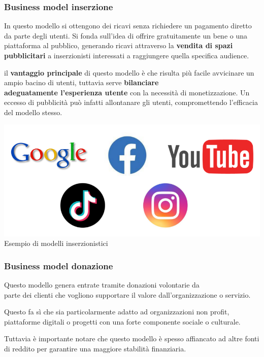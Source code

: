 \documentclass[14pt]{extarticle}
\begin{document}
\newpage
\subsubsection{Business model inserzione}

In questo modello si ottengono dei ricavi senza richiedere un pagamento diretto
da parte degli utenti. Si fonda sull'idea di offrire gratuitamente un bene o una
piattaforma al pubblico, generando ricavi attraverso la \textbf{vendita di spazi
pubblicitari} a inserzionisti interessati a raggiungere quella specifica
audience.

il \textbf{vantaggio principale} di questo modello è che risulta più facile
avvicinare un ampio bacino di utenti, tuttavia serve \textbf{bilanciare
\\adeguatamente l'esperienza utente} con la necessità di monetizzazione. Un
eccesso di pubblicità può infatti allontanare gli utenti, compromettendo
l'efficacia del modello stesso.

\begin{center}
    \includegraphics[scale=0.60]{images/inserzioni.png}
    Esempio di modelli inserzionistici
\end{center}

\subsubsection{Business model donazione}

Questo modello genera entrate tramite donazioni volontarie da \\parte dei
clienti che vogliono supportare il valore dall'organizzazione o servizio.

Questo fa sì che sia particolarmente adatto ad organizzazioni non profit,
piattaforme digitali o progetti con una forte componente sociale o culturale.

Tuttavia è importante notare che questo modello è spesso affiancato ad altre
fonti di reddito per garantire una maggiore stabilità finanziaria.
\end{document}
